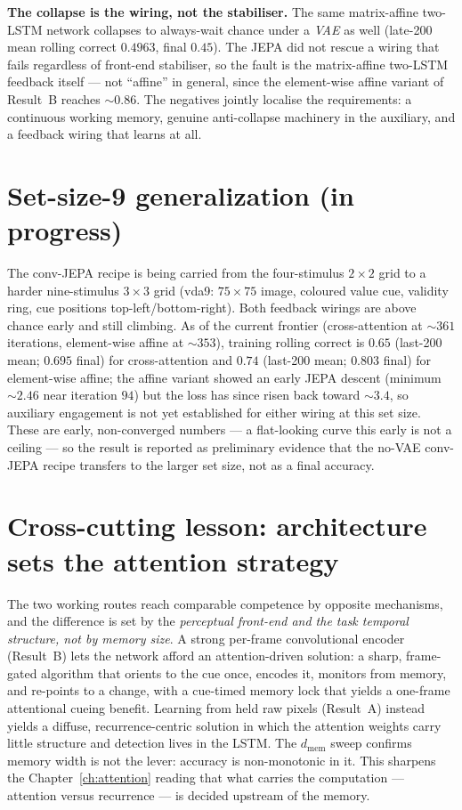 \textbf{The collapse is the wiring, not the stabiliser.} The same matrix-affine two-LSTM
network collapses to always-wait chance under a \emph{VAE} as well (late-200 mean rolling
correct $0.4963$, final $0.45$). The JEPA did not rescue a wiring that fails regardless of
front-end stabiliser, so the fault is the matrix-affine two-LSTM feedback itself --- not
``affine'' in general, since the element-wise affine variant of Result~B reaches $\sim0.86$.
The negatives jointly localise the requirements: a continuous working memory, genuine
anti-collapse machinery in the auxiliary, and a feedback wiring that learns at all.

\section{Set-size-9 generalization (in progress)}
The conv-JEPA recipe is being carried from the four-stimulus $2\times2$ grid to a harder
nine-stimulus $3\times3$ grid (vda9: $75\times75$ image, coloured value cue, validity ring,
cue positions top-left/bottom-right). Both feedback wirings are above chance early and still
climbing. As of the current frontier (cross-attention at $\sim361$ iterations, element-wise
affine at $\sim353$), training rolling correct is $0.65$ (last-200 mean; $0.695$ final) for
cross-attention and $0.74$ (last-200 mean; $0.803$ final) for element-wise affine; the affine
variant showed an early JEPA descent (minimum $\sim2.46$ near iteration $94$) but the loss has
since risen back toward $\sim3.4$, so auxiliary engagement is not yet established for either
wiring at this set size. These are early, non-converged numbers --- a flat-looking curve this
early is not a ceiling --- so the result is reported as preliminary evidence that the no-VAE
conv-JEPA recipe transfers to the larger set size, not as a final accuracy.

\section{Cross-cutting lesson: architecture sets the attention strategy}
The two working routes reach comparable competence by opposite mechanisms, and the difference
is set by the \emph{perceptual front-end and the task temporal structure, not by memory size}.
A strong per-frame convolutional encoder (Result~B) lets the network afford an attention-driven
solution: a sharp, frame-gated algorithm that orients to the cue once, encodes it, monitors
from memory, and re-points to a change, with a cue-timed memory lock that yields a one-frame
attentional cueing benefit. Learning from held raw pixels (Result~A) instead yields a diffuse,
recurrence-centric solution in which the attention weights carry little structure and detection
lives in the LSTM. The $d_{\text{mem}}$ sweep confirms memory width is not the lever: accuracy
is non-monotonic in it. This sharpens the Chapter~\ref{ch:attention} reading that what carries
the computation --- attention versus recurrence --- is decided upstream of the memory.

